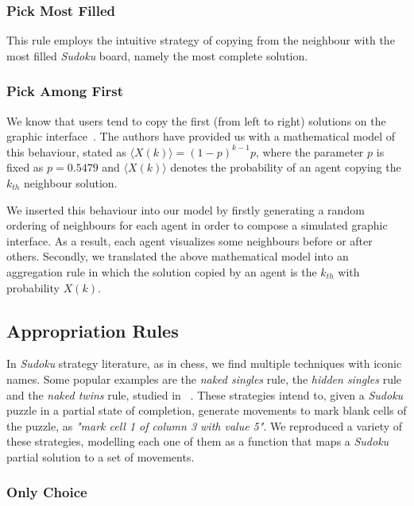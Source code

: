 \documentclass{article}
\begin{document}
\subsubsection{Pick Most Filled}

This rule employs the intuitive strategy of copying from the neighbour with the most filled {\em Sudoku} board, namely the most complete solution.

\subsubsection{Pick Among First}

We know that users tend to copy the first (from left to right) solutions on the graphic interface~\cite{farenzena:collabem}. The authors have provided us with a mathematical model of this behaviour, stated as $\langle X(k)\rangle = (1-p)^{k-1}p$, where the parameter $p$ is fixed as $p = 0.5479$ and $\langle X(k)\rangle$ denotes the probability of an agent copying the $k_{th}$ neighbour solution.

We inserted this behaviour into our model by firstly generating a random ordering of neighbours for each agent in order to compose a simulated graphic interface. As a result, each agent visualizes some neighbours before or after others. Secondly, we translated the above mathematical model into an aggregation rule in which the solution copied by an agent is the $k_{th}$ with probability $X(k)$.

\subsection{Appropriation Rules}

In {\em Sudoku} strategy literature, as in chess, we find multiple techniques with iconic names. Some popular examples are the {\em naked singles} rule, the {\em hidden singles} rule and the {\em naked twins} rule, studied in ~\cite{davis:mathsudoku}. These strategies intend to, given a {\em Sudoku} puzzle in a partial state of completion, generate movements to mark blank cells of the puzzle, as {\em "mark cell 1 of column 3 with value 5"}. We reproduced a variety of these strategies, modelling each one of them as a function that maps a {\em Sudoku} partial solution to a set of movements.

\subsubsection{Only Choice}
\end{document}

